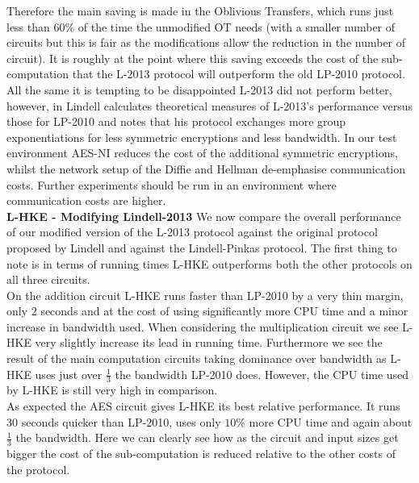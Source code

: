\documentclass[ %
                    author={Nicholas Tutte},
                supervisor={Prof. Nigel Smart},
                    degree={MEng},
                     title={Secure Two Party Computation},
                  subtitle={A practical comparison of recent protocols},
                      type={Research - GG1K},
                      year={2015} ]{dissertation}
\begin{document}
					Therefore the main saving is made in the Oblivious Transfers, which runs just less than  $60\%$ of the time the unmodified OT needs (with a smaller number of circuits but this is fair as the modifications allow the reduction in the number of circuit). It is roughly at the point where this saving exceeds the cost of the sub-computation that the L-2013 protocol will outperform the old LP-2010 protocol.\\

					All the same it is tempting to be disappointed L-2013 did not perform better, however, in \cite{Lindell_CnC_2013} Lindell calculates theoretical measures of L-2013's performance versus those for LP-2010 and notes that his protocol exchanges more group exponentiations for less symmetric encryptions and less bandwidth. In our test environment AES-NI reduces the cost of the additional symmetric encryptions, whilst the network setup of the Diffie and Hellman de-emphasise communication costs. Further experiments should be run in an environment where communication costs are higher.\\ 

					\noindent \textbf{L-HKE - Modifying Lindell-2013} We now compare the overall performance of our modified version of the L-2013 protocol against the original protocol proposed by Lindell and against the Lindell-Pinkas protocol. The first thing to note is in terms of running times L-HKE outperforms both the other protocols on all three circuits.\\

					On the addition circuit L-HKE runs faster than LP-2010 by a very thin margin, only 2 seconds and at the cost of using significantly more CPU time and a minor increase in bandwidth used. When considering the multiplication circuit we see L-HKE very slightly increase its lead in running time. Furthermore we see the result of the main computation circuits taking dominance over bandwidth as L-HKE uses just over $\frac{1}{3}$ the bandwidth LP-2010 does. However, the CPU time used by L-HKE is still very high in comparison.\\

					As expected the AES circuit gives L-HKE its best relative performance. It runs $30$ seconds quicker than LP-2010, uses only $10\%$ more CPU time and again about $\frac{1}{3}$ the bandwidth. Here we can clearly see how as the circuit and input sizes get bigger the cost of the sub-computation is reduced relative to the other costs of the protocol.\\
\end{document}
